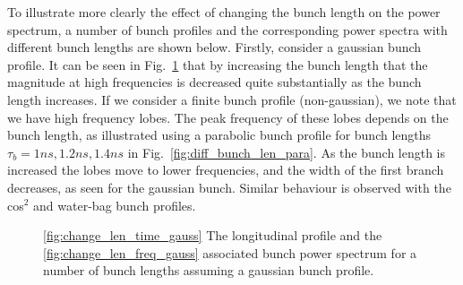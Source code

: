 \documentclass[12pt,a4paper,twopage,openright]{report}
\begin{document}
To illustrate more clearly the effect of changing the bunch length on the power spectrum, a number of bunch profiles and the corresponding power spectra with different bunch lengths are shown below. Firstly, consider a gaussian bunch profile. It can be seen in Fig.~\ref{fig:diff_bunch_len_gauss} that by increasing the bunch length that the magnitude at high frequencies is decreased quite substantially as the bunch length increases. If we consider a finite bunch profile (non-gaussian), we note that we have high frequency lobes. The peak frequency of these lobes depends on the bunch length, as illustrated using a parabolic bunch profile for bunch lengths $\tau_{b} = 1ns, 1.2ns, 1.4ns$ in Fig.~\ref{fig:diff_bunch_len_para}. As the bunch length is increased the lobes move to lower frequencies, and the width of the first branch decreases, as seen for the gaussian bunch. Similar behaviour is observed with the cos$^{2}$ and water-bag bunch profiles.

\begin{figure}
\caption{\ref{fig:change_len_time_gauss} The longitudinal profile and the \ref{fig:change_len_freq_gauss} associated bunch power spectrum for a number of bunch lengths assuming a gaussian bunch profile.}
\label{fig:diff_bunch_len_gauss}
\end{figure}
\end{document}
